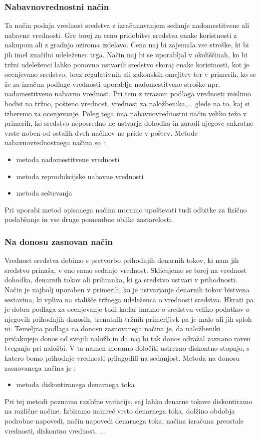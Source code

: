 \documentclass{article}
\begin{document}
\subsubsection{Nabavnovrednostni način}
Ta način podaja vrednost sredstva z izračunavanjem sedanje nadomestitvene ali nabavne vrednosti. Gre torej za ceno pridobitve sredstva enake koristnosti z nakupom ali z gradnjo oziroma izdelavo. Cena naj bi zajemala vse stroške, ki bi jih imel značilni udeleženec trga. Način naj bi se uporabljal v okoliščinah, ko bi tržni udeleženci lahko ponovno ustvarili sredstvo skoraj enake koristnosti, kot je ocenjevano sredstvo, brez regulativnih ali zakonskih omejitev ter v primerih, ko se že za izračun podlage vrednosti uporablja nadomestitvene stroške npr. nadomestitveno nabavno vrednost. Pri tem z izrazom podlaga vrednosti mislimo bodisi na tržno, pošteno vrednost, vrednost za naložbenika,... glede na to, kaj si izberemo za ocenjevanje. Poleg tega ima nabavnovrednostni način veliko težo v primerih, ko sredstvo neposredno ne ustvarja dohodka in zaradi njegove enkratne vrste noben od ostalih dveh načinov ne pride v poštev. 
Metode nabavnovrednostnega načina so :
\begin{itemize}
\item metoda nadomestitvene vrednosti
\item metoda reprodukcijske nabavne vrednosti
\item metoda seštevanja
\end{itemize}
Pri uporabi metod opisanega načina moramo upoštevati tudi odbitke za fizično poslabšanje in vse druge pomembne oblike zastarelosti.

\subsubsection{Na donosu zasnovan način}
Vrednost sredstva dobimo s pretvorbo prihodnjih denarnih tokov, ki nam jih sredstvo prinaša, v eno samo sedanjo vrednost. Sklicujemo se torej na vrednost dohodka, denarnih tokov ali prihranka, ki ga sredstvo ustvari v prihodnosti. Način je najbolj uporaben v primerih, ko je ustvarjanje denarnih tokov bistvena sestavina, ki vpliva na stališče tržnega udeleženca o vrednosti sredstva. Hkrati pa je dobra podlaga za ocenjevanje tudi kadar imamo o sredstvu veliko podatkov o njegovih prihodnjih donosih, trenutnih tržnih primerljivk pa je malo ali jih sploh ni. Temeljna podlaga na donosu zasnovanega načina je, da naložbeniki pričakujejo donos od svojih naložb in da naj bi tak donos odražal zaznano raven tveganja pri naložbi. V ta namen moramo določiti ustrezno diskontno stopnjo, s katero bomo prihodnje vrednosti prilagodili na sedanjost.
Metoda na donosu zasnovanega načina je :
\begin{itemize}
\item metoda diskontiranega denarnega toka
\end{itemize}
Pri tej metodi poznamo različne variacije, saj lahko denarne tokove diskontiramo na različne načine. Izbiramo namreč vrsto denarnega toka, dolžino obdobja podrobne napovedi, način napovedi denarnega toka, načina izračuna preostale vrednosti, diskontno vrednost, ... 
\end{document}

